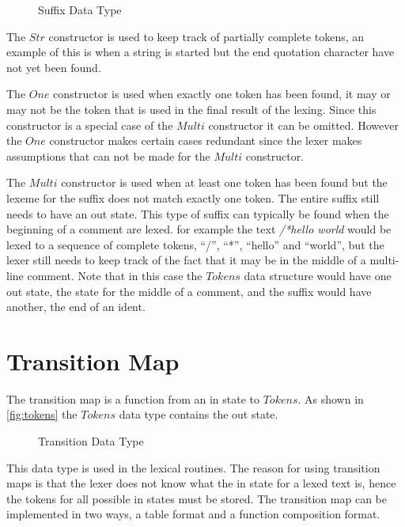 \begin{figure}[h!]
  
  \caption{Suffix Data Type\label{fig:suff}}
\end{figure}

The $Str$ constructor is used to keep track of partially complete tokens, an
example of this is when a string is started but the end quotation character have
not yet been found.

The $One$ constructor is used when exactly one token has been found, it may or
may not be the token that is used in the final result of the lexing. Since this
constructor is a special case of the $Multi$ constructor it can be omitted.
However the $One$ constructor makes certain cases redundant since the lexer
makes assumptions that can not be made for the $Multi$ constructor.

The $Multi$ constructor is used when at least one token has been found but the
lexeme for the suffix does not match exactly one token. The entire suffix still
needs to have an out state. This type of suffix can typically be found when
the beginning of a comment are lexed. for example the text \emph{/*hello world}
would be lexed to a sequence of complete tokens, ``/'', ``*'', ``hello'' and
``world'', but the lexer still needs to keep track of the fact that it may be in
the middle of a multi-line comment. Note that in this case the $Tokens$ data
structure would have one out state, the state for the middle of a comment, and
the suffix would have another, the end of an ident.

\section{Transition Map}
The transition map is a function from an in state to $Tokens$. As shown in
\cref{fig:tokens} the $Tokens$ data type contains the out state.

\begin{figure}[h!]
  
  \caption{Transition Data Type \label{fig:transition}}
\end{figure}

This data type is used in the lexical routines. The reason for using transition
maps is that the lexer does not know what the in state for a lexed text is, hence
the tokens for all possible in states must be stored. The transition map can be
implemented in two ways, a table format and a function composition format.

